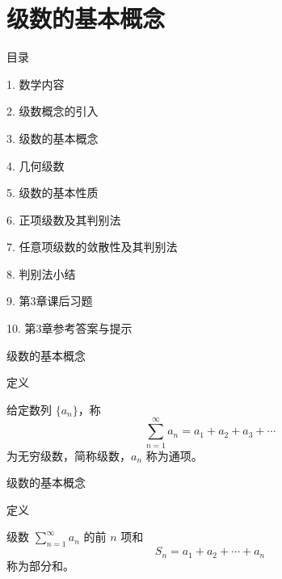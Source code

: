 \documentclass[aspectratio=169,10pt,fontset=fandol]{ctexbeamer}
\begin{document}
\section{级数的基本概念}
\begin{frame}[t,fragile]{目录}
\normalsize
{\color{black}\normalsize 1. 数学内容\par}\vspace{0.3em}
{\color{black}\normalsize 2. 级数概念的引入\par}\vspace{0.3em}
{\color{blue}\normalsize 3. 级数的基本概念\par}\vspace{0.3em}
{\color{gray!40}\normalsize 4. 几何级数\par}\vspace{0.3em}
{\color{gray!40}\normalsize 5. 级数的基本性质\par}\vspace{0.3em}
{\color{gray!40}\normalsize 6. 正项级数及其判别法\par}\vspace{0.3em}
{\color{gray!40}\normalsize 7. 任意项级数的敛散性及其判别法\par}\vspace{0.3em}
{\color{gray!40}\normalsize 8. 判别法小结\par}\vspace{0.3em}
{\color{gray!40}\normalsize 9. 第3章课后习题\par}\vspace{0.3em}
{\color{gray!40}\normalsize 10. 第3章参考答案与提示\par}\vspace{0.3em}
\end{frame}
\begin{frame}[t,fragile]{级数的基本概念}
\small
\begin{block}{定义}
{\small

给定数列 \(\{a_n\}\)，称
\[
\sum_{n=1}^{\infty} a_n = a_1 + a_2 + a_3 + \cdots
\]
为无穷级数，简称级数，\(a_n\) 称为通项。

}
\end{block}
\end{frame}
\begin{frame}[t,fragile]{级数的基本概念}
\small
\begin{block}{定义}
{\small

级数 \(\sum\limits_{n = 1}^{  \infty }  a_n\) 的前 \(n\) 项和
\[
S_n = a_1 + a_2 + \cdots + a_n
\]
称为部分和。

}
\end{block}
\end{frame}
\end{document}

